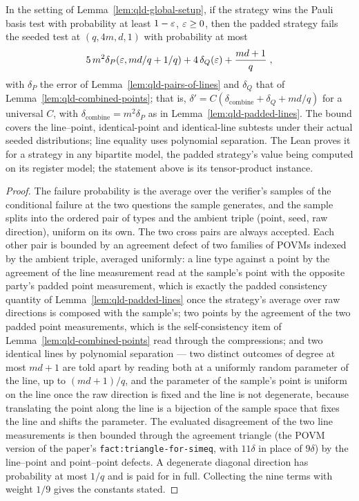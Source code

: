 \begin{lemma}
\leanok
In the setting of Lemma~\ref{lem:qld-global-setup}, if the strategy wins the Pauli basis test
with probability at least $1 - \varepsilon$, $\varepsilon \geq 0$, then the padded strategy fails the seeded
test at $(q, 4m, d, 1)$ with probability at most
\begin{equation*}
  5\, m^2 \delta_P(\varepsilon, md/q + 1/q) + 4\, \delta_Q(\varepsilon) + \frac{md + 1}{q}\;,
\end{equation*}
with $\delta_P$ the error of Lemma~\ref{lem:qld-pairs-of-lines} and $\delta_Q$ that of
Lemma~\ref{lem:qld-combined-points}; that is, $\delta' = C(\delta_{\mathrm{combine}} + \delta_Q
+ md/q)$ for a universal $C$, with $\delta_{\mathrm{combine}} = m^2 \delta_P$ as in
Lemma~\ref{lem:qld-padded-lines}. The bound covers the line--point, identical-point and
identical-line subtests under their actual seeded distributions; line equality uses polynomial
separation. The Lean proves it for a strategy in any bipartite model, the padded strategy's value
being computed on its register model; the statement above is its tensor-product instance.
\end{lemma}
\begin{proof}
\leanok
The failure probability is the average over the verifier's samples of the conditional failure at
the two questions the sample generates, and the sample splits into the ordered pair of types and
the ambient triple (point, seed, raw direction), uniform on its own. The two cross pairs are
always accepted. Each other pair is bounded by an agreement defect of two families of POVMs
indexed by the ambient triple, averaged uniformly: a line type against a point by the agreement
of the line measurement read at the sample's point with the opposite party's padded point
measurement, which is exactly the padded consistency quantity of Lemma~\ref{lem:qld-padded-lines}
once the strategy's average over raw directions is composed with the sample's; two points by the
agreement of the two padded point measurements, which is the self-consistency item of
Lemma~\ref{lem:qld-combined-points} read through the compressions; and two identical lines by
polynomial separation --- two distinct outcomes of degree at most $md + 1$ are told apart by
reading both at a uniformly random parameter of the line, up to $(md + 1)/q$, and the parameter
of the sample's point is uniform on the line once the raw direction is fixed and the line is not
degenerate, because translating the point along the line is a bijection of the sample space that
fixes the line and shifts the parameter. The evaluated disagreement of the two line measurements
is then bounded through the agreement triangle (the POVM version of the paper's
\texttt{fact:triangle-for-simeq}, with $11\delta$ in place of $9\delta$) by the line--point and
point--point defects. A degenerate diagonal direction has probability at most $1/q$ and is paid
for in full. Collecting the nine terms with weight $1/9$ gives the constants stated.
\end{proof}

